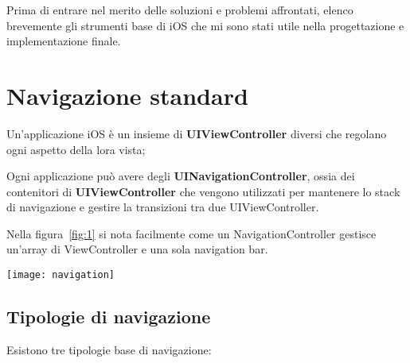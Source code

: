 

Prima di entrare nel merito delle soluzioni e problemi affrontati, elenco brevemente gli strumenti
base di iOS che mi sono stati utile nella progettazione e implementazione finale.

\section{Navigazione standard}

Un'applicazione iOS è un insieme di \textbf{UIViewController}\cite{viewcontroller} diversi che 
regolano ogni aspetto della lora vista;


Ogni applicazione può avere degli \textbf{UINavigationController}\cite{navigationcontroller},
ossia dei contenitori di \textbf{UIViewController} che vengono
utilizzati per mantenere lo stack di navigazione e gestire la transizioni tra due UIViewController.

Nella figura~\ref{fig:1} si nota facilmente come un NavigationController gestisce un'array di ViewController e una sola 
navigation bar. \\

\begin{minipage}{\linewidth}
    \centering
    \texttt{[image: navigation]}
    \label{fig:1}
\end{minipage}

\subsection{Tipologie di navigazione}\label{sec:navigation}

Esistono tre tipologie base di navigazione:

